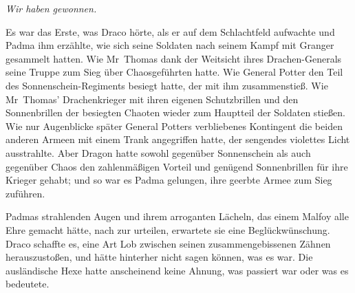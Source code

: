\later

\emph{Wir haben gewonnen.}

Es war das Erste, was Draco hörte, als er auf dem Schlachtfeld aufwachte und Padma ihm erzählte, wie sich seine Soldaten nach seinem Kampf mit Granger gesammelt hatten. Wie Mr~Thomas dank der Weitsicht ihres Drachen-Generals seine Truppe zum Sieg über Chaosgeführten hatte. Wie General Potter den Teil des Sonnenschein-Regiments besiegt hatte, der mit ihm zusammenstieß. Wie Mr~Thomas’ Drachenkrieger mit ihren eigenen Schutzbrillen und den Sonnenbrillen der besiegten Chaoten wieder zum Hauptteil der Soldaten stießen. Wie nur Augenblicke später General Potters verbliebenes Kontingent die beiden anderen Armeen mit einem Trank angegriffen hatte, der sengendes violettes Licht ausstrahlte. Aber Dragon hatte sowohl gegenüber Sonnenschein als auch gegenüber Chaos den zahlenmäßigen Vorteil und genügend Sonnenbrillen für ihre Krieger gehabt; und so war es Padma gelungen, ihre geerbte Armee zum Sieg zuführen.

Padmas strahlenden Augen und ihrem arroganten Lächeln, das einem Malfoy alle Ehre gemacht hätte, nach zur urteilen, erwartete sie eine Beglückwünschung. Draco schaffte es, eine Art Lob zwischen seinen zusammengebissenen Zähnen herauszustoßen, und hätte hinterher nicht sagen können, was es war. Die ausländische Hexe hatte anscheinend keine Ahnung, was passiert war oder was es bedeutete.

